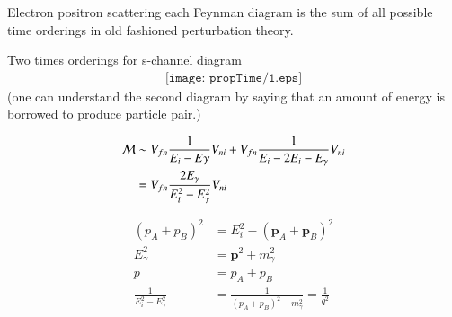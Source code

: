 Electron positron scattering
each Feynman diagram is the sum of all possible time orderings in old fashioned perturbation theory. 

Two times orderings for s-channel diagram
\begin{align*}
   \texttt{[image: propTime/1.eps]}
\end{align*}
(one can understand the second diagram by saying that an amount of energy is borrowed to produce particle pair.)

\begin{align*}
   \mathcal{M} &\sim V_{fn} \frac{1}{E_i - E\gamma} V_{ni} + V_{fn} \frac{1}{E_i - 2E_i - E_\gamma} V_{ni} \\
      &= V_{fn} \frac{2E_\gamma}{E_i^2 - E_\gamma^2} V_{ni}
\end{align*}

\begin{align*}
   (p_A + p_B) ^2 &= E_i^2 - (\pmb{p}_A + \pmb{p}_B)^2  \\
   E_\gamma^2 &= \pmb{p}^2 + m_\gamma^2 \\
   p &= p_A + p_B \\
   \frac{1}{E_i^2 - E_\gamma^2} &= \frac{1}{(p_A + p_B)^2 - m_\gamma^2} = \frac{1}{q^2}
\end{align*}
